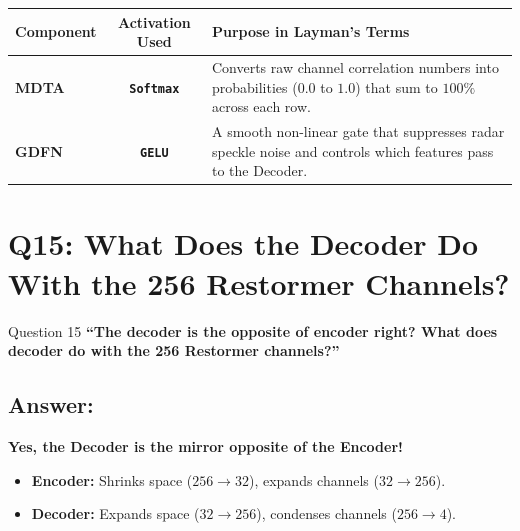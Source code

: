 \documentclass[11pt,a4paper]{article}
\begin{document}
\begin{center}
\begin{tabularx}{\textwidth}{lcX}
\toprule
\textbf{Component} & \textbf{Activation Used} & \textbf{Purpose in Layman's Terms} \\
\midrule
\textbf{MDTA} & \textbf{\texttt{Softmax}} & Converts raw channel correlation numbers into probabilities ($0.0$ to $1.0$) that sum to $100\%$ across each row. \\
\textbf{GDFN} & \textbf{\texttt{GELU}} & A smooth non-linear gate that suppresses radar speckle noise and controls which features pass to the Decoder. \\
\bottomrule
\end{tabularx}
\end{center}

\bigskip

\section{Q15: What Does the Decoder Do With the 256 Restormer Channels?}

\begin{questionbox}{Question 15}
\textbf{``The decoder is the opposite of encoder right? What does decoder do with the 256 Restormer channels?''}
\end{questionbox}

\subsection*{Answer:}
\textbf{Yes, the Decoder is the mirror opposite of the Encoder!}
\begin{itemize}[leftmargin=1.5em]
    \item \textbf{Encoder:} Shrinks space ($256 \to 32$), expands channels ($32 \to 256$).
    \item \textbf{Decoder:} Expands space ($32 \to 256$), condenses channels ($256 \to 4$).
\end{itemize}
\end{document}
